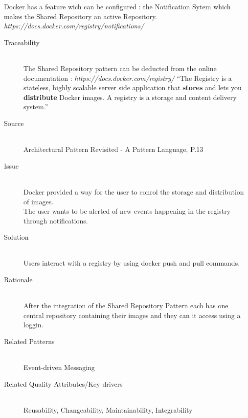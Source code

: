 Docker has a feature wich can be configured : the Notification Sytem which makes the Shared Repository an active Repository.
\textit{https://docs.docker.com/registry/notifications/}

\begin{description}
\item[Traceability]~\\
The Shared Repository pattern can be deducted from the online documentation : \textit{https://docs.docker.com/registry/} ``The Registry is a stateless, highly scalable server side application that \textbf{stores} and lets you \textbf{distribute} Docker images. A registry is a storage and content delivery system.''


\item[Source]~\\
Architectural Pattern Revisited - A Pattern Language, P.13 \cite{avgeriou2005architectural}

\item[Issue]~\\
Docker provided a way for the user to conrol the storage and distribution of images. \\
The user wants to be alerted of new events happening in the registry through notifications. %


\item[Solution]~\\ %
Users interact with a registry by using docker push and pull commands.

\item[Rationale]~\\ %
 After the integration of the Shared Repository Pattern each has one central repository containing their images and they can it access using a loggin. \\

\item [Related Patterns]~\\
Event-driven Messaging

\item [Related Quality Attributes/Key drivers]~\\
Reusability, Changeability, Maintainability, Integrability


\end{description}
